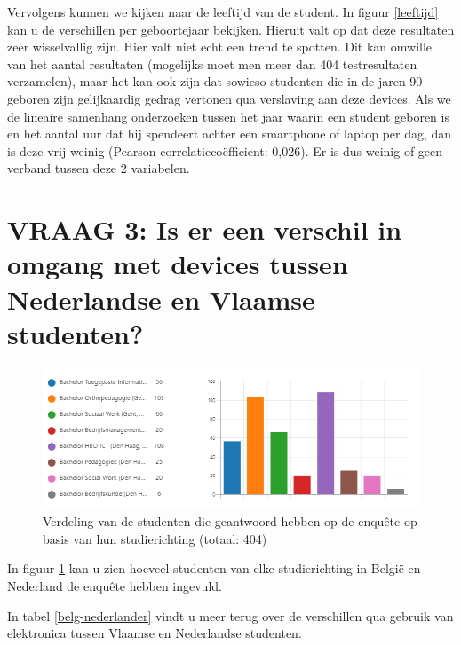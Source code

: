 Vervolgens kunnen we kijken naar de leeftijd van de student. In figuur \ref{leeftijd} kan u de verschillen per geboortejaar bekijken. Hieruit valt op dat deze resultaten zeer wisselvallig zijn. Hier valt niet echt een trend te spotten. Dit kan omwille van het aantal resultaten (mogelijks moet men meer dan 404 testresultaten verzamelen), maar het kan ook zijn dat sowieso studenten die in de jaren 90 geboren zijn gelijkaardig gedrag vertonen qua verslaving aan deze devices. Als we de lineaire samenhang onderzoeken tussen het jaar waarin een student geboren is en het aantal uur dat hij spendeert achter een smartphone of laptop per dag, dan is deze vrij weinig (Pearson-correlatiecoëfficient: 0,026). Er is dus weinig of geen verband tussen deze 2 variabelen.

\section{VRAAG 3: Is er een verschil in omgang met devices tussen Nederlandse en Vlaamse studenten?}
\label{sec:vlaanderen-nederland}

\begin{figure}
	\includegraphics[width=\textwidth]
	{img/verdeling-enquete-richting.png}
	\caption{Verdeling van de studenten die geantwoord hebben op de enquête op basis van hun studierichting (totaal: 404)}
	\label{fig:verdeling-enquete-richting}
\end{figure}

In figuur \ref{fig:verdeling-enquete-richting} kan u zien hoeveel studenten van elke studierichting in België en Nederland de enquête hebben ingevuld. 

In tabel \ref{belg-nederlander} vindt u meer terug over de verschillen qua gebruik van elektronica tussen Vlaamse en Nederlandse studenten.


